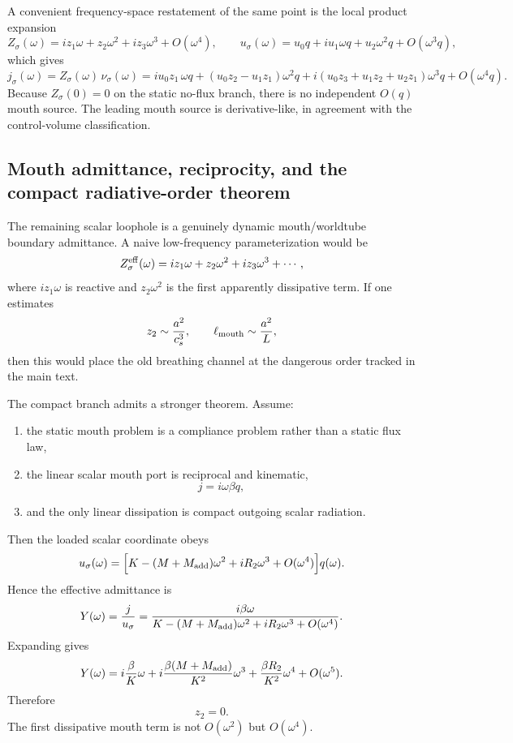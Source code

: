 \documentclass[11pt]{article}
\begin{document}
A convenient frequency-space restatement of the same point is the local product
expansion
\[
Z_\sigma(\omega)=iz_1\omega+z_2\omega^2+iz_3\omega^3+O(\omega^4),
\qquad
u_\sigma(\omega)=u_0q+i u_1\omega q+u_2\omega^2 q+O(\omega^3q),
\]
which gives
\[
j_\sigma(\omega)=Z_\sigma(\omega)\,\nu_\sigma(\omega)
=
i u_0z_1\,\omega q
+
(u_0z_2-u_1z_1)\omega^2 q
+
i(u_0z_3+u_1z_2+u_2z_1)\omega^3 q
+
O(\omega^4 q).
\]
Because $Z_\sigma(0)=0$ on the static no-flux branch, there is no independent
$O(q)$ mouth source.  The leading mouth source is derivative-like, in agreement
with the control-volume classification.

\subsection{Mouth admittance, reciprocity, and the compact radiative-order theorem}
\label{app:scalar-ledger-mouth}

The remaining scalar loophole is a genuinely dynamic mouth/worldtube boundary
admittance.  A naive low-frequency parameterization would be
\[
Z_\sigma^{\rm eff}(\omega)=iz_1\omega+z_2\omega^2+iz_3\omega^3+\cdots,
\]
where $iz_1\omega$ is reactive and $z_2\omega^2$ is the first apparently
 dissipative term.  If one estimates
\[
z_2\sim \frac{a^2}{c_s^3},
\qquad
\ell_{\rm mouth}\sim \frac{a^2}{L},
\]
then this would place the old breathing channel at the dangerous order tracked
in the main text.

The compact branch admits a stronger theorem.  Assume:
\begin{enumerate}
  \item the static mouth problem is a compliance problem rather than a static
  flux law,
  \item the linear scalar mouth port is reciprocal and kinematic,
  \[
  j=i\omega\beta q,
  \]
  \item and the only linear dissipation is compact outgoing scalar radiation.
\end{enumerate}
Then the loaded scalar coordinate obeys
\[
 u_\sigma(\omega)
 =
 \Bigl[K-(M+M_{\rm add})\omega^2+iR_2\omega^3+O(\omega^4)\Bigr]q(\omega).
\]
Hence the effective admittance is
\[
Y(\omega)
=
\frac{j}{u_\sigma}
=
\frac{i\beta\omega}{K-(M+M_{\rm add})\omega^2+iR_2\omega^3+O(\omega^4)}.
\]
Expanding gives
\[
Y(\omega)
=
i\frac{\beta}{K}\omega
+
i\frac{\beta(M+M_{\rm add})}{K^2}\omega^3
+
\frac{\beta R_2}{K^2}\omega^4
+
O(\omega^5).
\]
Therefore
\[
\boxed{z_2=0.}
\]
The first dissipative mouth term is not $O(\omega^2)$ but $O(\omega^4)$.
\end{document}
